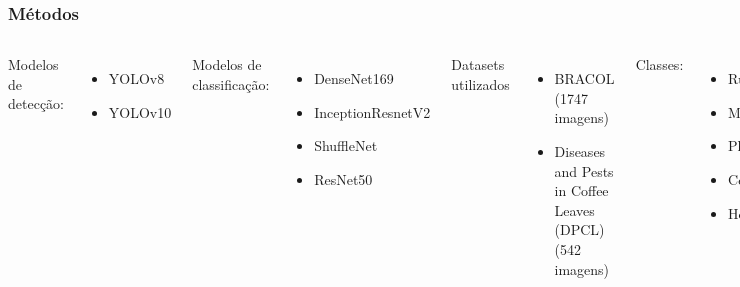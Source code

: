 \documentclass[aspectratio=169]{beamer}
\begin{document}
\begin{frame}
    \frametitle{Métodos}

    \begin{columns}

        
        Modelos de detecção:
        \begin{itemize}
            \item YOLOv8
            \item YOLOv10
        \end{itemize}
        
        Modelos de classificação:
        \begin{itemize}
            \item DenseNet169
            \item InceptionResnetV2
            \item ShuffleNet
            \item ResNet50
        \end{itemize}



        Datasets utilizados
        \begin{itemize}
            \item BRACOL (1747 imagens)
            \item Diseases and Pests in Coffee Leaves (DPCL) (542 imagens)
        \end{itemize}
        
        Classes:
        \begin{itemize}
            \item Rust
            \item Miner
            \item Phoma
            \item Cercospora
            \item Healthy*
        \end{itemize}


    \end{columns}

\end{frame}





\end{document}
